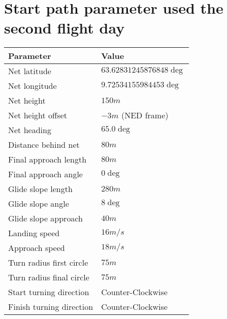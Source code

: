 \section{Start path parameter used the second flight day}\label{AP:SpecDay2}
\begin{table}
\centering
\begin{tabular}{| p{4cm} | p{4cm} |}
\hline
\textbf{Parameter}			& \textbf{Value}			\\ \hline
Net latitude				& $63.62831245876848 \deg$ 	\\ \hline
Net longitude				& $9.72534155984453 \deg$ 	\\ \hline
Net height					& $150 m$					\\ \hline
Net height offset			& $-3 m$ (NED frame)		\\ \hline
Net heading					& $65.0 \deg$				\\ \hline
Distance behind net			& $80 m$					\\ \hline
Final approach length		& $80 m$					\\ \hline
Final approach angle		& $0 \deg$					\\ \hline
Glide slope length			& $280 m $					\\ \hline
Glide slope angle			& $8 \deg$					\\ \hline
Glide slope approach		& $40 m$					\\ \hline
Landing speed				& $16 m/s$					\\ \hline
Approach speed				& $18 m/s$					\\ \hline
Turn radius first circle	& $75 m$					\\ \hline
Turn radius final circle	& $75 m$					\\ \hline
Start turning direction		& Counter-Clockwise			\\ \hline
Finish turning direction	& Counter-Clockwise			\\ \hline
\end{tabular}
\end{table}
